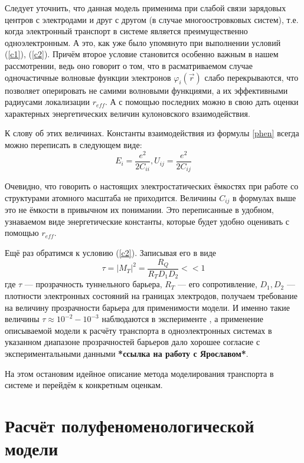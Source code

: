\documentclass[12pt,a4paper]{report}
\begin{document}
Следует уточнить, что данная модель применима при слабой связи зарядовых центров с электродами и друг с другом (в случае многоостровковых систем), т.е. когда электронный транспорт в системе является преимущественно одноэлектронным. А это, как уже было упомянуто при выполнении условий (\ref{c1}), (\ref{c2}). Причём второе условие становится особенно важным в нашем рассмотрении, ведь оно говорит о том, что в расматриваемом случае одночастичные волновые функции электронов $\varphi_i(\vec{r})$ слабо перекрываются, что позволяет оперировать не самими волновыми функциями, а их эффективными радиусами локализации $r_{eff}$. А с помощью последних можно в свою дать оценки характерных энергетических величин кулоновского взаимодействия.

К слову об этих величинах. Константы взаимодействия из формулы \ref{phen} всегда можно переписать в следующем виде:
\begin{equation}
E_i = \frac{e^2}{2 C_{ii}}, U_{ij} = \frac{e^2}{2 C_{ij}}
\end{equation}

Очевидно, что говорить о настоящих электростатических ёмкостях при работе со структурами атомного масштаба не приходится. Величины $C_{ij}$ в формулах выше это не ёмкости в привычном их понимании. Это переписанные в удобном, узнаваемом виде энергетические константы, которые будет удобно оценивать с помощью $r_{eff}$. 

Ещё раз обратимся к условию (\ref{c2}). Записывая его в виде
\begin{equation}
\tau = |M_T|^2 = \frac{R_Q}{R_T D_1 D_2} << 1
\end{equation}
где $\tau$ — прозрачность туннельного барьера, $R_T$ — его сопротивление, $D_1, D_2$ — плотности электронных состояний на границах электродов, получаем требование на величину прозрачности барьера для применимости модели. И именно такие величины $\tau \approx 10^{-2} - 10^{-3}$ наблюдаются в эксперименте \cite{SASET_EXP_OUR, patriot}, а применение описываемой модели к расчёту транспорта в одноэлектронных системах в указанном диапазоне прозрачностей барьеров дало хорошее согласие с экспериментальными данными \textbf{*ссылка на работу с Ярославом*}.

На этом остановим идейное описание метода моделирования транспорта в системе и перейдём к конкретным оценкам.

\chapter{Расчёт полуфеноменологической модели}
\end{document}
